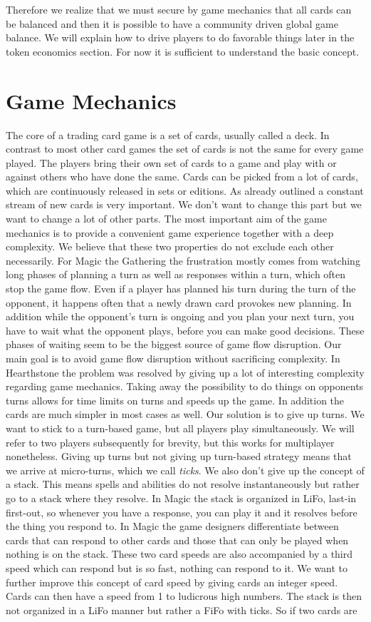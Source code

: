 \documentclass{article}
\begin{document}
Therefore we realize that we must secure by game mechanics that all cards can be balanced and then it is possible to have a community driven global game balance. We will explain how to drive players to do favorable things later in the token economics section. For now it is sufficient to understand the basic concept.
%
\section{Game Mechanics}
%
The core of a trading card game is a set of cards, usually called a deck. In contrast to most other card games the set of cards is not the same for every game played. The players bring their own set of cards to a game and play with or against others who have done the same. Cards can be picked from a lot of cards, which are continuously released in sets or editions. As already outlined a constant stream of new cards is very important. We don't want to change this part but we want to change a lot of other parts. The most important aim of the game mechanics is to provide a convenient game experience together with a deep complexity. We believe that these two properties do not exclude each other necessarily. For Magic the Gathering the frustration mostly comes from watching long phases of planning a turn as well as responses within a turn, which often stop the game flow. Even if a player has planned his turn during the turn of the opponent, it happens often that a newly drawn card provokes new planning. In addition while the opponent's turn is ongoing and you plan your next turn, you have to wait what the opponent plays, before you can make good decisions. These phases of waiting seem to be the biggest source of game flow disruption. Our main goal is to avoid game flow disruption without sacrificing complexity. In Hearthstone the problem was resolved by giving up a lot of interesting complexity regarding game mechanics. Taking away the possibility to do things on opponents turns allows for time limits on turns and speeds up the game. In addition the cards are much simpler in most cases as well. Our solution is to give up turns. We want to stick to a turn-based game, but all players play simultaneously. We will refer to two players subsequently for brevity, but this works for multiplayer nonetheless. Giving up turns but not giving up turn-based strategy means that we arrive at micro-turns, which we call \textit{ticks}. We also don't give up the concept of a stack. This means spells and abilities do not resolve instantaneously but rather go to a stack where they resolve. In Magic the stack is organized in LiFo, last-in first-out, so whenever you have a response, you can play it and it resolves before the thing you respond to. In Magic the game designers differentiate between cards that can respond to other cards and those that can only be played when nothing is on the stack. These two card speeds are also accompanied by a third speed which can respond but is so fast, nothing can respond to it. We want to further improve this concept of card speed by giving cards an integer speed. Cards can then have a speed from 1 to ludicrous high numbers. The stack is then not organized in a LiFo manner but rather a FiFo with ticks. So if two cards are 
\end{document}
